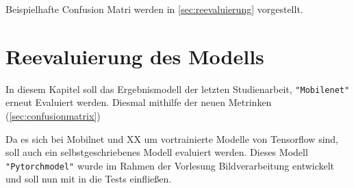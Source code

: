 Beispielhafte Confusion Matri werden in \autoref{sec:reevaluierung} vorgestellt.

\section{Reevaluierung des Modells} \label{sec:reevaluierung}

In diesem Kapitel soll das Ergebnismodell der letzten Studienarbeit, \texttt{"Mobilenet"} erneut Evaluiert werden. Diesmal mithilfe der neuen Metrinken (\autoref{sec:confusionmatrix})

Da es sich bei Mobilnet und XX um vortrainierte Modelle von Tensorflow sind, soll auch ein selbstgeschriebenes Modell evaluiert werden. Dieses Modell \texttt{"Pytorchmodel"} wurde im Rahmen der Vorlesung Bildverarbeitung entwickelt und soll nun mit in die Tests einfließen. 

